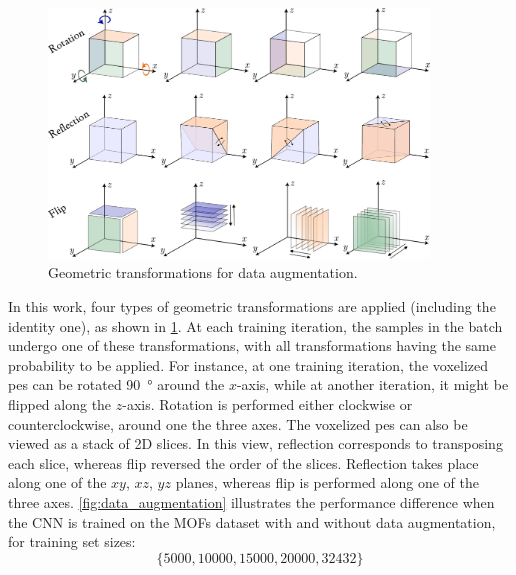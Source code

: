 \begin{figure}
	\centering
	\includegraphics[width=0.9\textwidth]{fig/transformations.pdf}
	\caption{Geometric transformations for data
	augmentation.}
	\label{fig:transformations}
\end{figure}

In this work, four types of geometric transformations are applied (including the
identity one), as shown in \Figure{} \ref{fig:transformations}. At each training
iteration, the samples in the batch undergo one of these transformations, with
all transformations having the same probability to be applied. For instance, at
one training iteration, the voxelized \gls{pes} can be rotated
\SI{90}{\degree} around the $x$-axis, while at another iteration, it might be
flipped along the $z$-axis. Rotation is performed either
clockwise or counterclockwise, around one the three axes. The voxelized \gls{pes}
can also be viewed as a stack of 2D slices. In this view,
reflection corresponds to transposing each slice, whereas flip
reversed the order of the slices. Reflection takes place along one of the $xy$,
$xz$, $yz$ planes, whereas flip is performed along one of the three axes.
\Figure{} \ref{fig:data_augmentation} illustrates the performance difference when
the CNN is trained on the MOFs dataset with and without data augmentation, for
training set sizes:
\begin{equation}
	\{
		\num{5000}, \num{10000},
		\num{15000}, \num{20000},
		\num{32432}
	\}
\end{equation}

